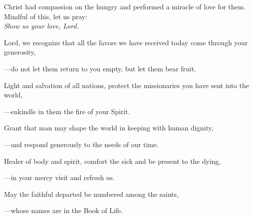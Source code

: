 \intercessions\indent

\begin{hangpar}

Christ had compassion on the hungry and performed a miracle of love for them. Mindful of this, let us pray:\\
\emph{Show us your love, Lord.}

\medskip Lord, we recognize that all the favors we have received today come through your generosity,

{\color{red}---\thinspace}do not let them return to you empty, but let them bear fruit.

\medskip Light and salvation of all nations, protect the missionaries you have sent into the world,

{\color{red}---\thinspace}enkindle in them the fire of your Spirit.

\medskip Grant that man may shape the world in keeping with human dignity,

{\color{red}---\thinspace}and respond generously to the needs of our time.

\medskip Healer of body and spirit, comfort the sick and be present to the dying,

{\color{red}---\thinspace}in your mercy visit and refresh us.

\medskip May the faithful departed be numbered among the saints,

{\color{red}---\thinspace}whose names are in the Book of Life.

\end{hangpar}

